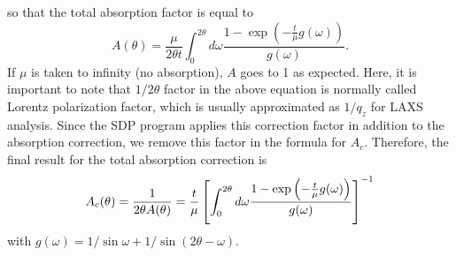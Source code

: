\documentclass[letterpaper,12pt]{article}
\begin{document}
so that the total absorption factor is equal to
\begin{equation}
  A(\theta) = \frac{\mu}{2\theta t} \int_0^{2\theta}d\omega 
      \frac{1-\exp\left(-\frac{t}{\mu}g(\omega)\right)}{g(\omega)}.
\end{equation}
If $\mu$ is taken to infinity (no absorption), $A$ goes to 1 as expected. 
Here, it is important to note that $1/2\theta$ factor in the above equation
is normally called Lorentz polarization factor, which
is usually approximated as $1/q_z$ for LAXS analysis. Since the SDP
program applies this correction factor in addition to the absorption
correction, we remove this factor in the formula for $A_c$. Therefore,
the final result for the total absorption correction is 
\begin{equation}
  A_c(\theta) 
    = \frac{1}{2\theta A(\theta)} \nonumber \\
    = \frac{t}{\mu} 
       \left[ 
         \int_0^{2\theta}d\omega 
         \frac{1-\exp\left(-\frac{t}{\mu}g(\omega)\right)}{g(\omega)}
       \right]^{-1}
\end{equation}
with $g(\omega)=1/\sin\omega+1/\sin(2\theta-\omega)$.
\end{document}
